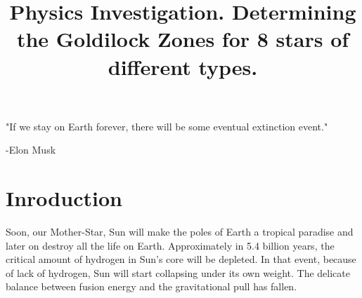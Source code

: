 \documentclass{article}
\title{Physics Investigation. Determining the Goldilock Zones for 8 stars of different types. }
\date{}
\author{}
\begin{document}
\maketitle

\onehalfspacing



\begin{center}
  "If we stay on Earth forever, there will be some eventual extinction event." 
\end{center}
\begin{flushright}
  -Elon Musk \cite{musk}
\end{flushright}


  



\section{Inroduction}

Soon, our Mother-Star, Sun will make the poles of Earth a tropical paradise and later on destroy all the life on Earth. Approximately in 5.4 billion years, the critical amount of hydrogen in Sun's core will be depleted. In that event, because of lack of hydrogen, Sun will start collapsing under its own weight. The delicate balance between fusion energy and the gravitational pull has fallen.\\
\end{document}
